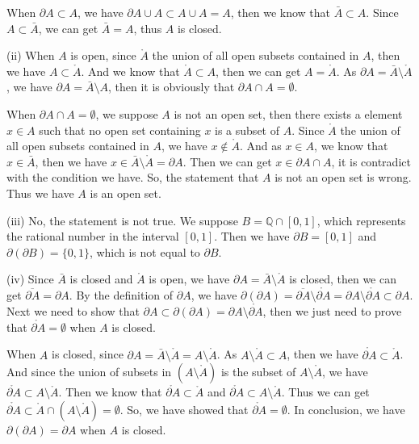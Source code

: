 \documentclass[12pt,a4paper]{ctexart}
\begin{document}
When $\partial A \subset A$, we have $\partial A \cup A \subset A \cup A = A$, then we know that $\bar{A} \subset A$. Since $A \subset \bar{A}$, we can get $\bar{A} = A$, thus $A$ is closed.

(ii) When $A$ is open, since $\mathring{A}$ the union of all open subsets contained in $A$, then we have $A \subset \mathring {A}$. And we know that $\mathring{A} \subset A$, then we can get $A = \mathring{A}$. As $\partial A = \bar{A} \setminus \mathring{A} $, we have $\partial A = \bar{A} \setminus A $, then it is obviously that $\partial A \cap  A  = \emptyset$.

When $\partial A \cap A = \emptyset$, we suppose $A$ is not an open set, then there exists a element $x \in A$ such that no open set containing $x$ is a subset of $A$. Since $\mathring{A}$ the union of all open subsets contained in $A$, we have $x \notin \mathring{A}$. And as $x \in A$, we know that $x \in \bar{A}$, then we have $x \in \bar{A} \setminus \mathring{A} = \partial A$. Then we can get $x \in  \partial A \cap A $, it is contradict with the condition we have. So, the statement that $A$ is not an open set is wrong. Thus we have $A$ is an open set.

(iii) No, the statement is not true. We suppose $B = \mathbb{Q} \cap [0, 1]$, which represents the rational number in the interval $[0, 1]$. Then we have $\partial B = [0, 1]$ and $\partial (\partial B) = \{0, 1\}$, which is not equal to $\partial B$.

(iv) Since $\bar{A}$ is closed and $\mathring{A}$ is open, we have $\partial A = \bar{A} \setminus \mathring{A} $ is closed, then we can get $\overline{\partial A} = \partial A$. By the definition of $\partial A$, we have $\partial (\partial A) = \overline{\partial A} \setminus \mathring{\partial A} = \partial A \setminus \mathring{\partial A} \subset \partial A$. Next we need to show that $\partial A \subset \partial (\partial A) = \partial A \setminus \mathring{\partial A}$, then we just need to prove that $\mathring{\partial A} = \emptyset$ when $A$ is closed. 

When $A$ is closed, since $\partial A = \bar{A} \setminus \mathring{A} = A \setminus \mathring{A}$. As $A \setminus \mathring{A} \subset A$, then we have $\mathring{\partial A} \subset \mathring{A}$. And since the union of subsets in $(A \setminus \mathring{A})$ is the subset of $ A \setminus \mathring{A}$, we have $\mathring{\partial A} \subset A \setminus \mathring{A}$. Then we know that $\mathring{\partial A} \subset \mathring{A}$ and $\mathring{\partial A} \subset A \setminus \mathring{A}$. Thus we can get $\mathring{\partial A} \subset \mathring{A} \cap (A \setminus \mathring{A}) = \emptyset$. So, we have showed that $\mathring{\partial A} = \emptyset$. In conclusion, we have $\partial(\partial A) = \partial A$ when $A$ is closed.
\end{document}
